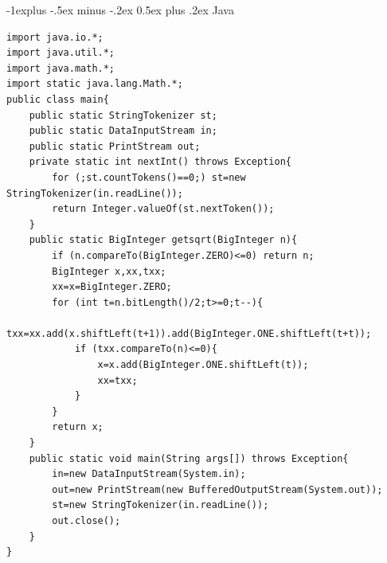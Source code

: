 \documentclass[10pt,landscape]{article}
\makeatletter
\renewcommand{\subsection}{\@startsection{subsection}{2}{0mm}%
                                {-1explus -.5ex minus -.2ex}%
                                {0.5ex plus .2ex}%
                                {\normalfont\normalsize\bfseries}}
\makeatother
\begin{document}
\begin{multicols}{2}
\subsection{Java}
\begin{lstlisting}
import java.io.*;
import java.util.*;
import java.math.*;
import static java.lang.Math.*;
public class main{
    public static StringTokenizer st;
    public static DataInputStream in;
    public static PrintStream out;
    private static int nextInt() throws Exception{
        for (;st.countTokens()==0;) st=new StringTokenizer(in.readLine());
        return Integer.valueOf(st.nextToken());
    }
    public static BigInteger getsqrt(BigInteger n){
        if (n.compareTo(BigInteger.ZERO)<=0) return n;
        BigInteger x,xx,txx;
        xx=x=BigInteger.ZERO;
        for (int t=n.bitLength()/2;t>=0;t--){
            txx=xx.add(x.shiftLeft(t+1)).add(BigInteger.ONE.shiftLeft(t+t));
            if (txx.compareTo(n)<=0){
                x=x.add(BigInteger.ONE.shiftLeft(t));
                xx=txx;
            }
        }
        return x;
    }
    public static void main(String args[]) throws Exception{
        in=new DataInputStream(System.in);
        out=new PrintStream(new BufferedOutputStream(System.out));
        st=new StringTokenizer(in.readLine());
        out.close();
    }
}

\end{lstlisting}
\end{multicols}
\end{document}
